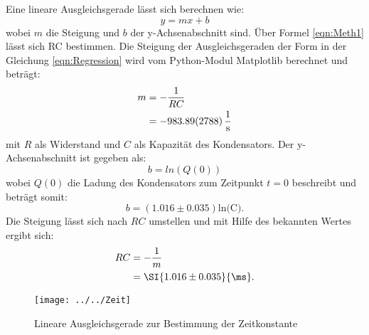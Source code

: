 Eine lineare Ausgleichsgerade lässt sich berechnen wie:
\begin{equation}
\label{eqn:Regression}
y = mx+b
\end{equation}
wobei $m$ die Steigung und $b$ der y-Achsenabschnitt sind. Über Formel \ref{eqn:Meth1} lässt sich RC bestimmen. Die Steigung der Ausgleichsgeraden der Form in der Gleichung \ref{eqn:Regression} wird vom Python-Modul Matplotlib berechnet und beträgt:
\begin{align*}
m &= -\frac{1}{RC} \\
  &= \SI{-983.89 \pm 27.88}{\frac{1}{s}}
\end{align*}
mit $R$ als Widerstand und $C$ als Kapazität des Kondensators.
Der y-Achsenabschnitt ist gegeben als:
\begin{equation*}
b = ln(Q(0)) 
\end{equation*}
wobei $Q(0)$ die Ladung des Kondensators zum Zeitpunkt $t=0$ beschreibt und beträgt somit:
\begin{equation*}
b = (1.016 \pm 0.035) \text{ln(C)}.
\end{equation*}
Die Steigung lässt sich nach $RC$ umstellen und mit Hilfe des bekannten Wertes ergibt sich:
\begin{align*}
RC &= -\frac{1}{m} \\
   &= \SI{1.016 \pm 0.035}{\ms} .
\end{align*}
\begin{figure}[h!]
	\centering
	\texttt{[image: ../../Zeit]}
	\caption{Lineare Ausgleichsgerade zur Bestimmung der Zeitkonstante}
	\label{fig:zeit}
\end{figure}
